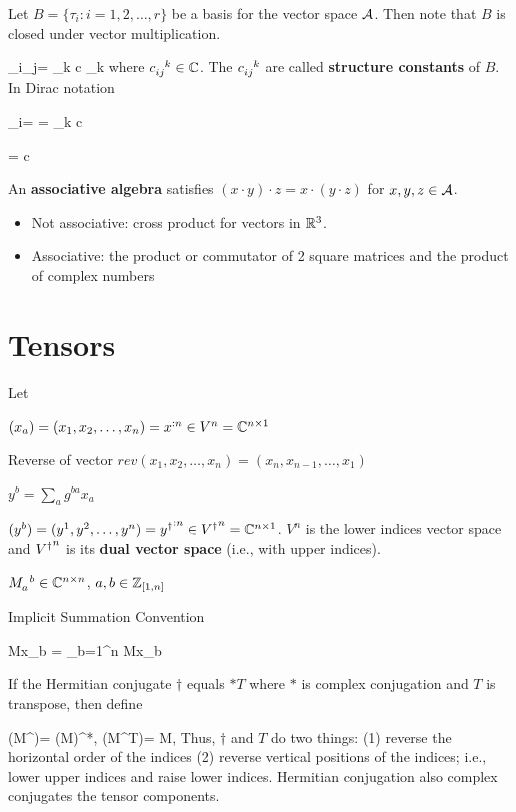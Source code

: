 Let $B = \{\tau_i: i=1, 2, \ldots, r\}$
be a basis for the vector space ${\cal A}$. 
Then note that
$B$ is closed under vector multiplication. 

\beq
\tau_i\cdot \tau_j=
\sum_k c \tau_k
\eeq
where $c\indices{_{ij}^k}\in\CC$.
The $c\indices{_{ij}^k}$ are called 
{\bf structure constants} of $B$.
In Dirac notation

\beq
\tau_i=
=
\sum_k c
\eeq

\beq
{}= c
\eeq

An {\bf associative algebra} satisfies 
$(x\cdot y)\cdot z = x\cdot(y\cdot z)$ for
$x,y,z\in {\cal A}$.
\begin{itemize}
\item Not associative: cross product for vectors in  ${ \mathbb{R}}^3$.
\item Associative:
the product or commutator of 2  square matrices and the product of complex numbers
\end{itemize}

\section{Tensors}
\label{sec-tensors}
Let 

$(x_a)=(x_1, x_2, \ldots, x_n) = x^{:n}\in V^n={ \mathbb{C}}^{n\times 1}$

Reverse of vector $rev(x_1, x_2, \ldots, x_n)=
(x_n, x_{n-1},
\ldots, x_1)$

$y^b = \sum_a g^{ba} x_a$

$(y^b)=(y^1, y^2, \ldots, y^n)= {y^\dagger}^{:n}\in {V^\dagger}^n={ \mathbb{C}}^{n\times 1}$. $V^n$ is the lower indices vector space and
${V^\dagger}^n$ is its {\bf dual vector space} (i.e., with upper indices).



$M\indices{_a^b}\in \CC^{n\times n}$, $a, b\in{\mathbb{Z}}_{[1,n]}$

Implicit Summation Convention

\beq
Mx_b = \sum_{b=1}^n
Mx_b
\eeq



If the Hermitian conjugate $\dagger$
equals $*T$ where $*$ is complex conjugation and $T$ is transpose,
then define

\beq
(M^\dagger)= (M)^*,
\quad
(M^T)= M,
\eeq
Thus, $\dagger$ and $T$ 
do two things: (1) reverse the horizontal order of the indices (2)
reverse vertical positions
of the indices; i.e., 
lower upper indices and raise lower indices.
Hermitian conjugation 
also complex conjugates the tensor components.

